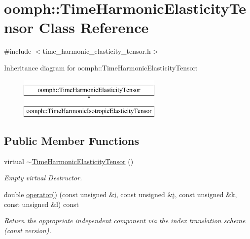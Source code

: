 \hypertarget{classoomph_1_1TimeHarmonicElasticityTensor}{}\section{oomph\+:\+:Time\+Harmonic\+Elasticity\+Tensor Class Reference}
\label{classoomph_1_1TimeHarmonicElasticityTensor}


{\ttfamily \#include $<$time\+\_\+harmonic\+\_\+elasticity\+\_\+tensor.\+h$>$}

Inheritance diagram for oomph\+:\+:Time\+Harmonic\+Elasticity\+Tensor\+:\begin{figure}[H]
\begin{center}
\leavevmode
\includegraphics[height=2.000000cm]{classoomph_1_1TimeHarmonicElasticityTensor}
\end{center}
\end{figure}
\subsection*{Public Member Functions}
\begin{DoxyCompactItemize}
\item 
virtual \hyperlink{classoomph_1_1TimeHarmonicElasticityTensor_aa1813e96fe387cfb05ae97892a1fdd84}{$\sim$\+Time\+Harmonic\+Elasticity\+Tensor} ()
\begin{DoxyCompactList}\small\item\em Empty virtual Destructor. \end{DoxyCompactList}\item 
double \hyperlink{classoomph_1_1TimeHarmonicElasticityTensor_a9af7ee0d97cb9308092795098b775b11}{operator()} (const unsigned \&\hyperlink{cfortran_8h_adb50e893b86b3e55e751a42eab3cba82}{i}, const unsigned \&j, const unsigned \&k, const unsigned \&l) const
\begin{DoxyCompactList}\small\item\em Return the appropriate independent component via the index translation scheme (const version). \end{DoxyCompactList}\end{DoxyCompactItemize}
